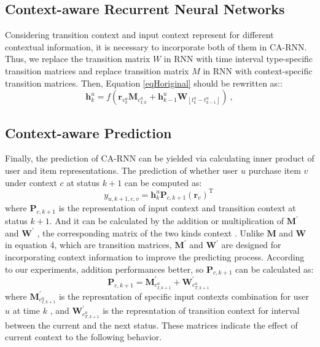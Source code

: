 \documentclass[conference]{IEEEtran}
\begin{document}
\subsection{Context-aware Recurrent Neural Networks}
Considering transition context and input context represent for different contextual information, it is necessary to incorporate both of them in CA-RNN. Thus, we replace the transition matrix $W$ in RNN with time interval type-specific transition matrices and replace transition matrix $M$ in RNN with context-specific transition matrices. Then, Equation \ref{eqHoriginal} should be rewritten as::
\begin{equation}\label{eqHt}
\textbf{h}_{k}^{u}=f\left ( \textbf{r}_{v_{k}^{u}}\textbf{M}_{c_{I,k}^{u}}+\textbf{h}_{k-1}^{u}\textbf{W}_{\left\lfloor t_k^u-t_{k-1}^u \right\rfloor }\right )~,
\end{equation}


\subsection{Context-aware Prediction}

Finally, the prediction of CA-RNN can be yielded via calculating inner product of user and item representations. The prediction of whether user $u$ purchase item $v$  under context $c$ at status $k+1$ can be computed as:
\begin{equation}
y_{u, k+1, c, v} = \mathbf{h}_{k}^{u}\mathbf{P}_{c, k+1}(\mathbf{r}_{v})^ \mathrm{ T }~
\end{equation}
where $\mathbf{P}_{c, k+1}$ is the representation of input context and transition context at status $k+1$. And it can be calculated by the addition or multiplication of $\mathbf{M}^{'}$ and $\mathbf{W}^{'}$ , the corresponding matrix of the two kinds context . Unlike $\mathbf{M}$ and $\mathbf{W}$ in equation 4, which are transition matrices, $\mathbf{M}^{'}$ and $\mathbf{W}^{'}$ are designed for incorporating context information to improve the predicting process. According to our experiments, addition performances better, so $\mathbf{P}_{c, k+1}$ can be calculated as:
\begin{equation}   \label{eqPadd}
\mathbf{P}_{c, k+1}=\mathbf{M}_{c_{I,k+1}^{u}}^{'} + \mathbf{W}_{c_{T,k+1}^{u}}^{'}~
\end{equation}
where $\mathbf{M}_{c_{I,k+1}^{u}}^{'}$ is the represntation of specific input contexts combination for user $u$ at time $k$ , and $\mathbf{W}_{c_{T,k+1}^{u}}^{'}$ is the represntation of transition context for interval between the current and the next status. These matrices indicate the effect of current context to the following behavior.
\end{document}
